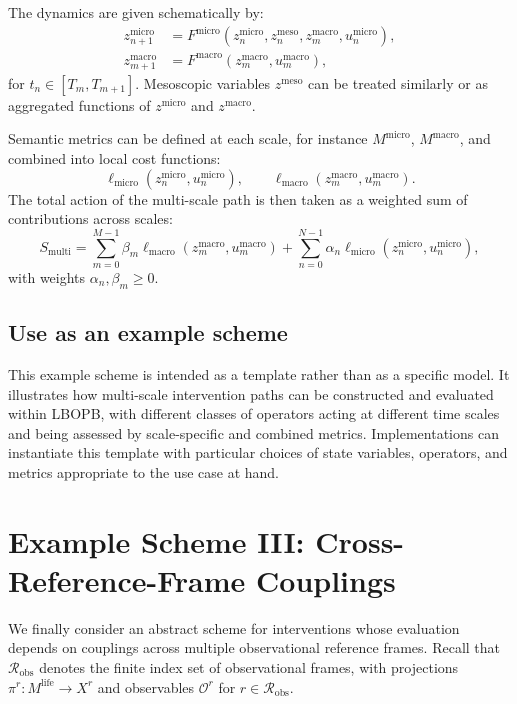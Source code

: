 \documentclass[11pt]{book}
\theoremstyle{plain}
\theoremstyle{definition}
\theoremstyle{remark}
\begin{document}
The dynamics are given schematically by:
\begin{align*}
  z^{\mathrm{micro}}_{n+1}
  &= F^{\mathrm{micro}}(z^{\mathrm{micro}}_{n},
                        z^{\mathrm{meso}}_{n},
                        z^{\mathrm{macro}}_{m},
                        u^{\mathrm{micro}}_{n}),
  \\
  z^{\mathrm{macro}}_{m+1}
  &= F^{\mathrm{macro}}(z^{\mathrm{macro}}_{m},
                        u^{\mathrm{macro}}_{m}),
\end{align*}
for $t_{n} \in [T_{m}, T_{m+1}]$. Mesoscopic variables
$z^{\mathrm{meso}}$ can be treated similarly or as aggregated functions
of $z^{\mathrm{micro}}$ and $z^{\mathrm{macro}}$.

Semantic metrics can be defined at each scale, for instance
$M^{\mathrm{micro}}$, $M^{\mathrm{macro}}$, and combined into local
cost functions:
\[
  \ell_{\mathrm{micro}}(z^{\mathrm{micro}}_{n}, u^{\mathrm{micro}}_{n}),
  \qquad
  \ell_{\mathrm{macro}}(z^{\mathrm{macro}}_{m}, u^{\mathrm{macro}}_{m}).
\]
The total action of the multi-scale path is then taken as a weighted
sum of contributions across scales:
\[
  S_{\mathrm{multi}} =
  \sum_{m=0}^{M-1} \beta_{m}
    \ell_{\mathrm{macro}}(z^{\mathrm{macro}}_{m}, u^{\mathrm{macro}}_{m})
  +
  \sum_{n=0}^{N-1} \alpha_{n}
    \ell_{\mathrm{micro}}(z^{\mathrm{micro}}_{n}, u^{\mathrm{micro}}_{n}),
\]
with weights $\alpha_{n}, \beta_{m} \ge 0$.

\subsection*{Use as an example scheme}

This example scheme is intended as a template rather than as a specific
model. It illustrates how multi-scale intervention paths can be
constructed and evaluated within LBOPB, with different classes of
operators acting at different time scales and being assessed by
scale-specific and combined metrics. Implementations can instantiate
this template with particular choices of state variables, operators,
and metrics appropriate to the use case at hand.

\section{Example Scheme III: Cross-Reference-Frame Couplings}


We finally consider an abstract scheme for interventions whose
evaluation depends on couplings across multiple observational reference
frames. Recall that $\mathcal{R}_{\mathrm{obs}}$ denotes the finite
index set of observational frames, with projections
$\pi^{r} \colon M^{\mathrm{life}} \to X^{r}$ and observables
$\mathcal{O}^{r}$ for $r \in \mathcal{R}_{\mathrm{obs}}$.
\end{document}
